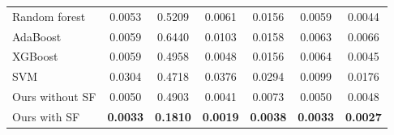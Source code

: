 \documentclass{ieeeaccess}
\begin{document}
\begin{table}[t]
\begin{tabular*}{0.9\textwidth}{c @{\extracolsep{\fill}} ccccccc}
    \hline

    \multicolumn{2}{l}{Random forest} & 0.0053 & 0.5209 & 0.0061 & 0.0156 & 0.0059 & 0.0044 \\
    \multicolumn{2}{l}{AdaBoost} & 0.0059 & 0.6440 & 0.0103 & 0.0158 & 0.0063 & 0.0066 \\
    \multicolumn{2}{l}{XGBoost} & 0.0059 & 0.4958 & 0.0048 & 0.0156 & 0.0064 & 0.0045 \\
    \multicolumn{2}{l}{SVM} & 0.0304 & 0.4718 & 0.0376 & 0.0294 & 0.0099 & 0.0176 \\

    \hline
    \hline
    
    \multicolumn{2}{l}{Ours without SF}        & 0.0050          & 0.4903          & 0.0041          & 0.0073          & 0.0050          & 0.0048 \\
    \multicolumn{2}{l}{Ours with SF}           & \textbf{0.0033} & \textbf{0.1810} & \textbf{0.0019} & \textbf{0.0038} & \textbf{0.0033} & \textbf{0.0027} \\
    \hline

  \end{tabular*}
  \label{table:comparison-mae}
\end{table}

\end{document}
